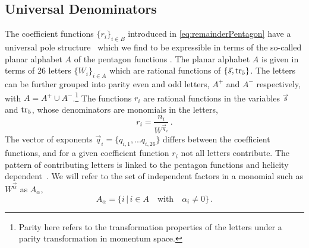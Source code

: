 \subsection{Universal Denominators}

The coefficient functions $\{r_i\}_{i\in B}$ introduced in
\cref{eq:remainderPentagon}  have a universal pole 
structure~\cite{Abreu:2018zmy,Abreu:2019odu} which we find to be expressible in terms of
the so-called planar alphabet $A$ of the pentagon functions \cite{Gehrmann:2018yef}.
The planar alphabet $A$ is given in terms
of 26 letters $\{W_i\}_{i\in A}$ which are rational functions of $\{\vec{s},\operatorname{tr_5}\}$.
The letters can be further grouped into parity even and odd letters, 
$A^+$ and $A^-$ respectively, with $A=A^+\cup A^-$.\footnote{Parity here refers to  
  the transformation properties of the letters under a parity transformation in 
momentum space.}
The functions $r_i$ are rational functions in the variables ${\vec s}$ and $\operatorname{tr_5}$,  
whose denominators are monomials in the letters,
\begin{equation}
    r_i = \frac{n_{i}}{ W^{\vec q_i}}\,.
    \label{eq:letterDecomposition}
\end{equation}
The vector of exponents $\vec q_i=\{q_{i,1}, ... q_{i,26}\}$ 
differs between the coefficient functions, and for a given
coefficient function $r_i$ not all letters contribute. The pattern of
contributing letters is linked to the pentagon functions and helicity
dependent~\cite{Abreu:2018zmy,Abreu:2019odu}. 
We will refer to the set of 
independent factors in a monomial such as $W^{\vec\alpha}$ as $A_\alpha$,
\begin{equation}\label{eq:A_alp}
		A_\alpha = \{ i\,|\, i \in A \quad \mbox{with} \quad \alpha_i\neq 0 \} \,.
\end{equation}

